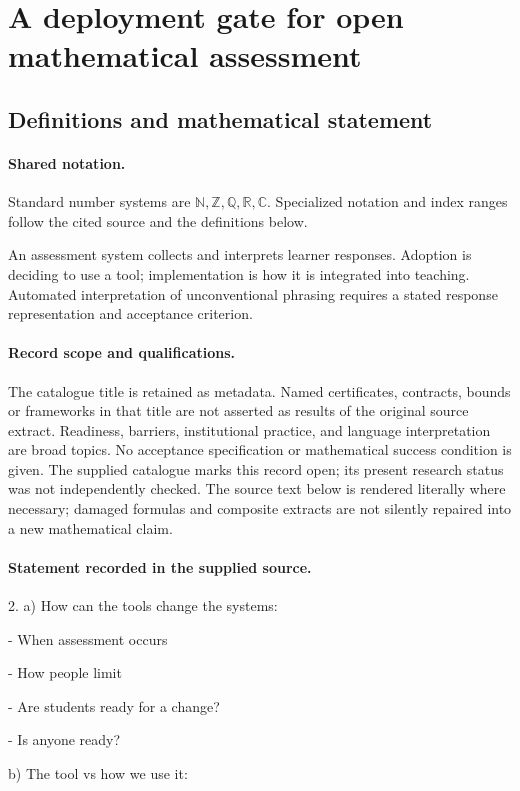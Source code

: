 \documentclass[11pt]{article}
\begin{document}
\section{A deployment gate for open mathematical assessment}\label{statement}

\subsection{Definitions and mathematical statement}

\paragraph{Shared notation.}Standard number systems are $\mathbb N,\mathbb Z,\mathbb Q,\mathbb R,\mathbb C$. Specialized notation and index ranges follow the cited source and the definitions below.


An assessment system collects and interprets learner responses. Adoption is deciding to use a tool; implementation is how it is integrated into teaching. Automated interpretation of unconventional phrasing requires a stated response representation and acceptance criterion.
\paragraph{Record scope and qualifications.}
The catalogue title is retained as metadata. Named certificates, contracts, bounds or frameworks in that title are not asserted as results of the original source extract.
Readiness, barriers, institutional practice, and language interpretation are broad topics. No acceptance specification or mathematical success condition is given. The supplied catalogue marks this record open; its present research status was not independently checked.
The source text below is rendered literally where necessary; damaged formulas and composite extracts are not silently repaired into a new mathematical claim.
\paragraph{Statement recorded in the supplied source.}
2. a) How can the tools change the systems:

- When assessment occurs

- How people limit

- Are students ready for a change?

- Is anyone ready?

b) The tool vs how we use it:
\end{document}
